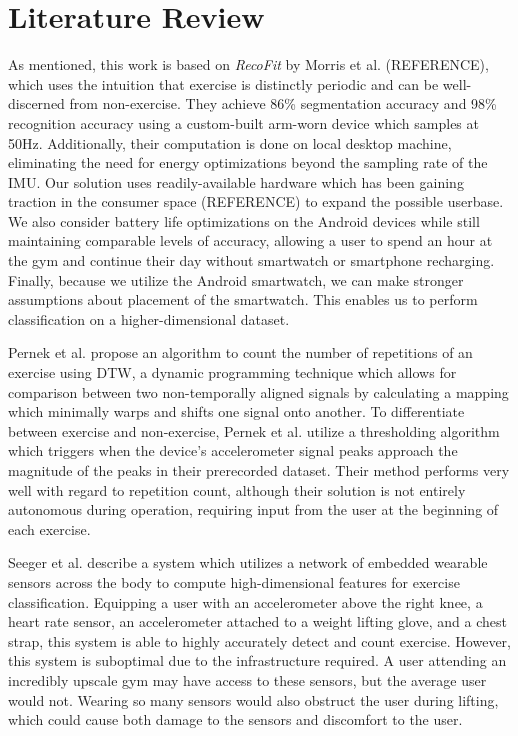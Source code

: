 \chapter{Literature Review}

As mentioned, this work is based on \textit{RecoFit} by Morris et al. (REFERENCE), which uses the intuition that exercise is distinctly periodic and can be well-discerned from non-exercise. They achieve 86\% segmentation accuracy and 98\% recognition accuracy using a custom-built arm-worn device which samples at 50Hz. Additionally, their computation is done on local desktop machine, eliminating the need for energy optimizations beyond the sampling rate of the IMU. Our solution uses readily-available hardware which has been gaining traction in the consumer space (REFERENCE) to expand the possible userbase. We also consider battery life optimizations on the Android devices while still maintaining comparable levels of accuracy, allowing a user to spend an hour at the gym and continue their day without smartwatch or smartphone recharging. Finally, because we utilize the Android smartwatch, we can make stronger assumptions about placement of the smartwatch. This enables us to perform classification on a higher-dimensional dataset.

Pernek et al. propose an algorithm to count the number of repetitions of an exercise using DTW, a dynamic programming technique which allows for comparison between two non-temporally aligned signals by calculating a mapping which minimally warps and shifts one signal onto another. To differentiate between exercise and non-exercise, Pernek et al. utilize a thresholding algorithm which triggers when the device's accelerometer signal peaks approach the magnitude of the peaks in their prerecorded dataset. Their method performs very well with regard to repetition count, although their solution is not entirely autonomous during operation, requiring input from the user at the beginning of each exercise.

Seeger et al. describe a system which utilizes a network of embedded wearable sensors across the body to compute high-dimensional features for exercise classification. Equipping a user with an accelerometer above the right knee, a heart rate sensor, an accelerometer attached to a weight lifting glove, and a chest strap, this system is able to highly accurately detect and count exercise. However, this system is suboptimal due to the infrastructure required. A user attending an incredibly upscale gym may have access to these sensors, but the average user would not. Wearing so many sensors would also obstruct the user during lifting, which could cause both damage to the sensors and discomfort to the user. 

